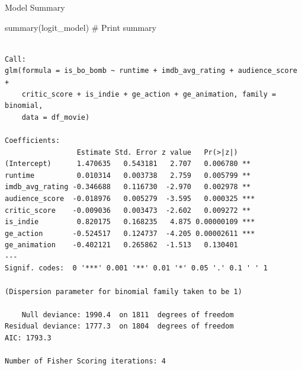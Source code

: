 \documentclass[
  10pt,
  ignorenonframetext,
]{beamer}
\newenvironment{Shaded}{\begin{snugshade}}{\end{snugshade}}
\newcommand{\CommentTok}[1]{\textcolor[rgb]{0.37,0.37,0.37}{#1}}
\newcommand{\FunctionTok}[1]{\textcolor[rgb]{0.28,0.35,0.67}{#1}}
\newcommand{\NormalTok}[1]{\textcolor[rgb]{0.00,0.23,0.31}{#1}}
\begin{document}
\begin{frame}[fragile]{Model Summary}
\label{model-summary}
\tiny

\begin{Shaded}
\begin{Highlighting}[]
\FunctionTok{summary}\NormalTok{(logit\_model) }\CommentTok{\# Print summary}
\end{Highlighting}
\end{Shaded}

\begin{verbatim}

Call:
glm(formula = is_bo_bomb ~ runtime + imdb_avg_rating + audience_score + 
    critic_score + is_indie + ge_action + ge_animation, family = binomial, 
    data = df_movie)

Coefficients:
                 Estimate Std. Error z value   Pr(>|z|)    
(Intercept)      1.470635   0.543181   2.707   0.006780 ** 
runtime          0.010314   0.003738   2.759   0.005799 ** 
imdb_avg_rating -0.346688   0.116730  -2.970   0.002978 ** 
audience_score  -0.018976   0.005279  -3.595   0.000325 ***
critic_score    -0.009036   0.003473  -2.602   0.009272 ** 
is_indie         0.820175   0.168235   4.875 0.00000109 ***
ge_action       -0.524517   0.124737  -4.205 0.00002611 ***
ge_animation    -0.402121   0.265862  -1.513   0.130401    
---
Signif. codes:  0 '***' 0.001 '**' 0.01 '*' 0.05 '.' 0.1 ' ' 1

(Dispersion parameter for binomial family taken to be 1)

    Null deviance: 1990.4  on 1811  degrees of freedom
Residual deviance: 1777.3  on 1804  degrees of freedom
AIC: 1793.3

Number of Fisher Scoring iterations: 4
\end{verbatim}
\end{frame}
\end{document}
